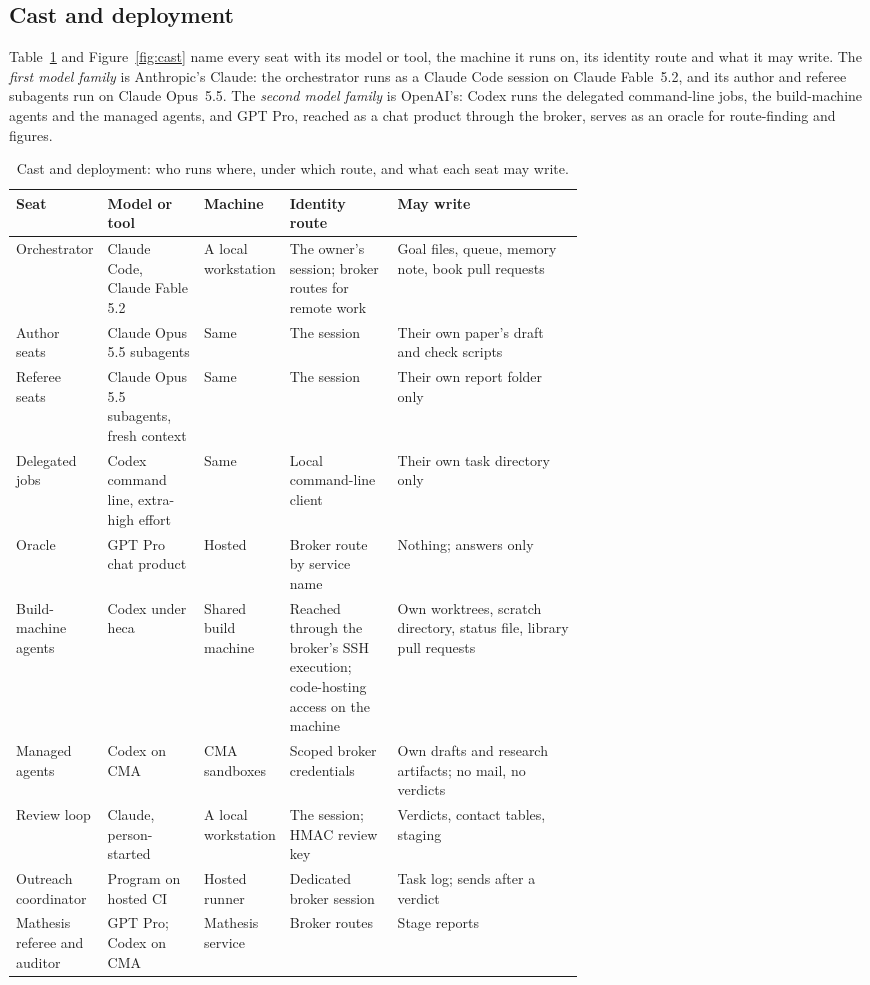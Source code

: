 \documentclass[11pt]{article}
\begin{document}
\subsection{Cast and deployment}
\label{sec:cast}
Table~\ref{tab:cast} and Figure~\ref{fig:cast} name every seat with its model
or tool, the machine it runs on, its identity route and what it may write.
The \emph{first model family} is Anthropic's Claude: the orchestrator runs as
a Claude Code session on Claude Fable~5.2, and its author and referee
subagents run on Claude Opus~5.5. The \emph{second model family} is
OpenAI's: Codex runs the delegated command-line jobs, the build-machine
agents and the managed agents, and GPT Pro, reached as a chat product through
the broker, serves as an oracle for route-finding and figures.

\begin{table}[htbp]
\centering\scriptsize
\caption{Cast and deployment: who runs where, under which route, and what each
seat may write.}
\label{tab:cast}
\begin{tabularx}{\linewidth}{@{}>{\raggedright\arraybackslash}p{0.15\linewidth}>{\raggedright\arraybackslash}p{0.17\linewidth}>{\raggedright\arraybackslash}p{0.15\linewidth}>{\raggedright\arraybackslash}p{0.19\linewidth}>{\raggedright\arraybackslash}X@{}}
\toprule
Seat & Model or tool & Machine & Identity route & May write \\
\midrule
Orchestrator & Claude Code, Claude Fable 5.2 & A local workstation & The owner's session; broker routes for remote work & Goal files, queue, memory note, book pull requests \\
Author seats & Claude Opus 5.5 subagents & Same & The session & Their own paper's draft and check scripts \\
Referee seats & Claude Opus 5.5 subagents, fresh context & Same & The session & Their own report folder only \\
Delegated jobs & Codex command line, extra-high effort & Same & Local command-line client & Their own task directory only \\
Oracle & GPT Pro chat product & Hosted & Broker route by service name & Nothing; answers only \\
Build-machine agents & Codex under heca & Shared build machine & Reached through the broker's SSH execution; code-hosting access on the machine & Own worktrees, scratch directory, status file, library pull requests \\
Managed agents & Codex on CMA & CMA sandboxes & Scoped broker credentials & Own drafts and research artifacts; no mail, no verdicts \\
Review loop & Claude, person-started & A local workstation & The session; HMAC review key & Verdicts, contact tables, staging \\
Outreach coordinator & Program on hosted CI & Hosted runner & Dedicated broker session & Task log; sends after a verdict \\
Mathesis referee and auditor & GPT Pro; Codex on CMA & Mathesis service & Broker routes & Stage reports \\
\bottomrule
\end{tabularx}
\end{table}
\end{document}
